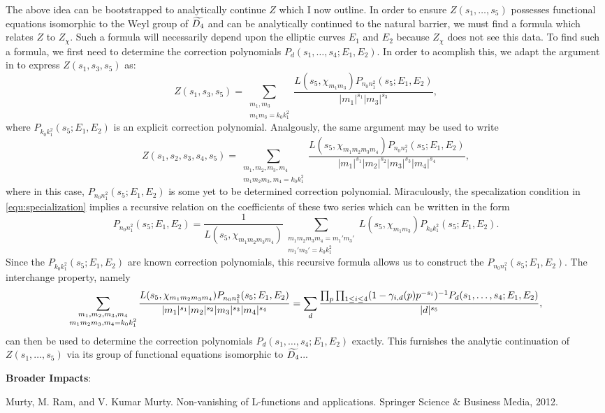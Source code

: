 \documentclass[12pt,reqno,oneside]{amsart}
\begin{document}
The above idea can be bootstrapped to analytically continue $Z$ which I now outline. In order to ensure $Z(s_{1},\ldots,s_{5})$ possesses functional equations isomorphic to the Weyl group of $\widetilde{D_{4}}$ and can be analytically continued to the natural barrier, we must find a formula which relates $Z$ to $Z_{\chi}$. Such a formula will necessarily depend upon the elliptic curves $E_{1}$ and $E_{2}$ because $Z_{\chi}$ does not see this data. To find such a formula, we first need to determine the correction polynomials $P_{d}(s_{1},\ldots,s_{4};E_{1},E_{2})$. In order to acomplish this, we adapt the argument in  to express $Z(s_{1},s_{3},s_{5})$ as:
\[
  Z(s_{1},s_{3},s_{5}) = \sum_{\substack{m_{1},m_{3} \\ m_{1}m_{3} = k_{0}k_{1}^{2}}}\frac{L(s_{5},\chi_{m_{1}m_{3}})P_{n_{0}n_{1}^{2}}(s_{5};E_{1},E_{2})}{|m_{1}|^{s_{1}}|m_{3}|^{s_{3}}},
\]
where $P_{k_{0}k_{1}^{2}}(s_{5};E_{1},E_{2})$ is an explicit correction polynomial. Analgously, the same argument may be used to write
\[
  Z(s_{1},s_{2},s_{3},s_{4},s_{5}) = \sum_{\substack{m_{1},m_{2},m_{3},m_{4} \\ m_{1}m_{2}m_{3},m_{4} = k_{0}k_{1}^{2}}}\frac{L(s_{5},\chi_{m_{1}m_{2}m_{3}m_{4}})P_{n_{0}n_{1}^{2}}(s_{5};E_{1},E_{2})}{|m_{1}|^{s_{1}}|m_{2}|^{s_{2}}|m_{3}|^{s_{3}}|m_{4}|^{s_{4}}},
\]
where in this case, $P_{n_{0}n_{1}^{2}}(s_{5};E_{1},E_{2})$ is some yet to be determined correction polynomial. Miraculously, the specalization condition in \cref{equ:specialization} implies a recursive relation on the coefficients of these two series which can be written in the form
\[
  P_{n_{0}n_{1}^{2}}(s_{5};E_{1},E_{2}) = \frac{1}{L(s_{5},\chi_{m_{1}m_{2}m_{3}m_{4}})}\sum_{\substack{m_{1}m_{2}m_{3}m_{4} = m_{1}'m_{3}' \\ m_{1}'m_{3}' = k_{0}k_{1}^{2}}}L(s_{5},\chi_{m_{1}m_{3}})P_{k_{0}k_{1}^{2}}(s_{5};E_{1},E_{2}).
\]
Since the $P_{k_{0}k_{1}^{2}}(s_{5};E_{1},E_{2})$ are known correction polynomials, this recursive formula allows us to construct the $P_{n_{0}n_{1}^{2}}(s_{5};E_{1},E_{2})$. The interchange property, namely
\[
  \sum_{\substack{m_{1},m_{2},m_{3},m_{4} \\ m_{1}m_{2}m_{3},m_{4} = k_{0}k_{1}^{2}}}\frac{L(s_{5},\chi_{m_{1}m_{2}m_{3}m_{4}})P_{n_{0}n_{1}^{2}}(s_{5};E_{1},E_{2})}{|m_{1}|^{s_{1}}|m_{2}|^{s_{2}}|m_{3}|^{s_{3}}|m_{4}|^{s_{4}}} = \sum_{d}\frac{\prod_{p}\prod_{1 \le i \le 4}(1-\gamma_{i,d}(p)p^{-s_{i}})^{-1}P_{d}(s_{1},\ldots,s_{4};E_{1},E_{2})}{|d|^{s_{5}}},
\]
can then be used to determine the correction polynomials $P_{d}(s_{1},\ldots,s_{4};E_{1},E_{2})$ exactly. This furnishes the analytic continuation of $Z(s_{1},\ldots,s_{5})$ via its group of functional equations isomorphic to $\widetilde{D_{4}}$...

\textbf{Broader Impacts}:

\begin{thebibliography}{}
  Murty, M. Ram, and V. Kumar Murty. Non-vanishing of L-functions and applications. Springer Science \& Business Media, 2012.
\end{thebibliography}
\end{document}
